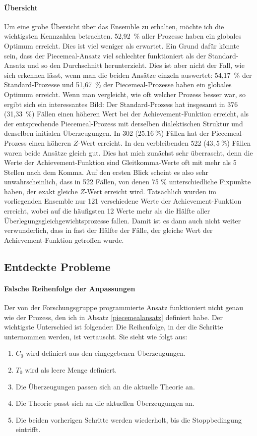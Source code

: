 \documentclass{article}
\begin{document}
\paragraph{Übersicht} Um eine grobe Übersicht über das Ensemble zu erhalten, möchte ich die wichtigsten Kennzahlen betrachten. 52,92~\% aller Prozesse haben ein globales Optimum erreicht. Dies ist viel weniger als erwartet. Ein Grund dafür könnte sein, dass der Piecemeal-Ansatz viel schlechter funktioniert als der Standard-Ansatz und so den Durchschnitt herunterzieht. Dies ist aber nicht der Fall, wie sich erkennen lässt, wenn man die beiden Ansätze einzeln auswertet: 54,17~\% der Standard-Prozesse und 51,67~\% der Piecemeal-Prozesse haben ein globales Optimum erreicht. Wenn man vergleicht, wie oft welcher Prozess besser war, so ergibt sich ein interessantes Bild: Der Standard-Prozess hat insgesamt in 376 (31,33~\%) Fällen einen höheren Wert bei der Achievement-Funktion erreicht, als der entsprechende Piecemeal-Prozess mit derselben dialektischen Struktur und denselben initialen Überzeugungen. In 302 ($25.1\overline{6}~\%$) Fällen hat der Piecemeal-Prozess einen höheren $Z$-Wert erreicht. In den verbleibenden 522 ($43,5~\%$) Fällen waren beide Ansätze gleich gut. Dies hat mich zunächst sehr überrascht, denn die Werte der Achievement-Funktion sind Gleitkomma-Werte oft mit mehr als 5 Stellen nach dem Komma. Auf den ersten Blick scheint es also sehr unwahrscheinlich, dass in 522 Fällen, von denen 75 \% unterschiedliche Fixpunkte haben, der exakt gleiche $Z$-Wert erreicht wird. Tatsächlich wurden im vorliegenden Ensemble nur 121 verschiedene Werte der Achievement-Funktion erreicht, wobei auf die häufigsten 12 Werte mehr als die Hälfte aller Überlegungsgleichgewichtsprozesse fallen. Damit ist es dann auch nicht weiter verwunderlich, dass in fast der Hälfte der Fälle, der gleiche Wert der Achievement-Funktion getroffen wurde.


\subsection{Entdeckte Probleme} \label{found problems}
\paragraph{Falsche Reihenfolge der Anpassungen} Der von der Forschungsgruppe programmierte Ansatz funktioniert nicht genau wie der Prozess, den ich in Absatz \ref{piecemealansatz} definiert habe. Der wichtigste Unterschied ist folgender: Die Reihenfolge, in der die Schritte unternommen werden, ist vertauscht. Sie sieht wie folgt aus:
\begin{enumerate}
    \item $C_0$ wird definiert aus den eingegebenen Überzeugungen.
    \item $T_0$ wird als leere Menge definiert.
    \item Die Überzeugungen passen sich an die aktuelle Theorie an.
    \item Die Theorie passt sich an die aktuellen Überzeugungen an.
    \item Die beiden vorherigen Schritte werden wiederholt, bis die Stoppbedingung eintrifft.
\end{enumerate}
\end{document}
